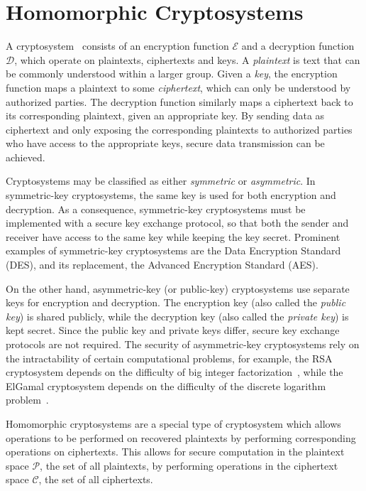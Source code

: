 \section{Homomorphic Cryptosystems}

A cryptosystem~\cite{bauer_cryptosystem_2005} consists of an encryption function $\mathcal{E}$ and a decryption function $\mathcal{D}$, which operate on plaintexts, ciphertexts and keys. A \textit{plaintext} is text that can be commonly understood within a larger group. Given a \textit{key}, the encryption function maps a plaintext to some \textit{ciphertext}, which can only be understood by authorized parties. The decryption function similarly maps a ciphertext back to its corresponding plaintext, given an appropriate key. By sending data as ciphertext and only exposing the corresponding plaintexts to authorized parties who have access to the appropriate keys, secure data transmission can be achieved.

Cryptosystems may be classified as either \textit{symmetric} or \textit{asymmetric}. 
In symmetric-key cryptosystems, the same key is used for both encryption and decryption. As a consequence, symmetric-key cryptosystems must be implemented with a secure key exchange protocol, so that both the sender and receiver have access to the same key while keeping the key secret. 
Prominent examples of symmetric-key cryptosystems are the Data Encryption Standard (DES), and its replacement, the Advanced Encryption Standard (AES).

On the other hand, asymmetric-key (or public-key) cryptosystems use separate keys for encryption and decryption. The encryption key (also called the \textit{public key}) is shared publicly, while the decryption key (also called the \textit{private key}) is kept secret. Since the public key and private keys differ, secure key exchange protocols are not required. The security of asymmetric-key cryptosystems rely on the intractability of certain computational problems, for example, the RSA cryptosystem depends on the difficulty of big integer factorization~\cite{rivest_method_1978}, while the ElGamal cryptosystem depends on the difficulty of the discrete logarithm problem~\cite{blakley_public_1985}.

Homomorphic cryptosystems are a special type of cryptosystem which allows operations to be performed on recovered plaintexts by performing corresponding operations on ciphertexts. This allows for secure computation in the plaintext space $\mathcal{P}$, the set of all plaintexts, by performing operations in the ciphertext space $\mathcal{C}$, the set of all ciphertexts. 

